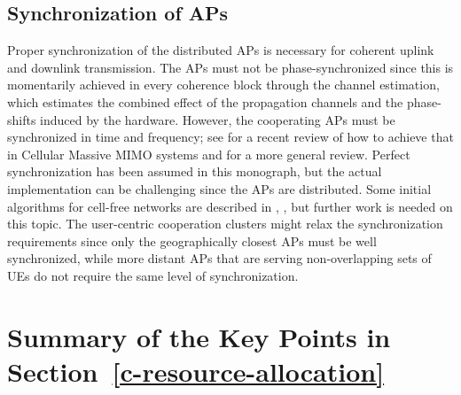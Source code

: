 \subsection{Synchronization of APs}

Proper synchronization of the distributed APs is necessary for coherent uplink and downlink transmission. The APs must not be phase-synchronized since this is momentarily achieved in every coherence block through the channel estimation, which estimates the combined effect of the propagation channels and the phase-shifts induced by the hardware. However, the cooperating APs must be  synchronized in time and frequency; see \cite{Jeong2020a} for a recent review of how to achieve that in Cellular Massive MIMO systems and \cite{Etzlinger2018a} for a more general review. Perfect synchronization has been assumed in this monograph, but the actual implementation can be challenging since the APs are distributed. Some initial algorithms for cell-free networks are described in \cite{Cheng2013a}, \cite{Interdonato2018}, but further work is needed on this topic. The user-centric cooperation clusters might relax the synchronization requirements since only the geographically closest APs must be well synchronized, while more distant APs that are serving non-overlapping sets of UEs do not require the same level of synchronization.


\newpage
\enlargethispage{\baselineskip} 
\section{Summary of the Key Points in Section~\ref{c-resource-allocation}}
\label{c-resource-allocation-summary}


